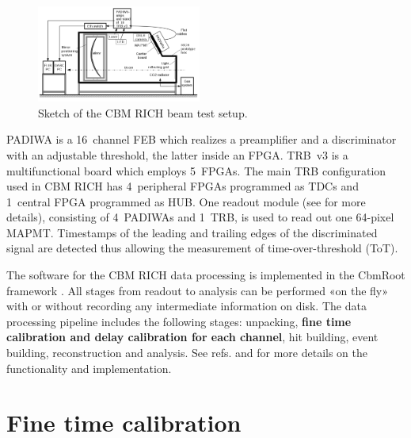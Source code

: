 \documentclass[final,5p,times,twocolumn]{elsarticle}
\begin{document}
\begin{figure}[h]
	\centering
	\includegraphics[width=0.48\textwidth]{figures/Beamtime_eng_RICH2016_poster.png}
	\caption{Sketch of the CBM RICH beam test setup.}
	\label{fig:BeamSetup}
\end{figure}

PADIWA is a 16~channel FEB which realizes a preamplifier and a discriminator with an adjustable threshold, the latter inside an FPGA. TRB~v3 is a multifunctional board which employs 5~FPGAs. The main TRB configuration used in CBM RICH has 4~peripheral FPGAs programmed as TDCs \cite{TDC} and 1~central FPGA programmed as HUB. One readout module (see \cite{PEPAN} for more details), consisting of 4~PADIWAs and 1~TRB, is used to read out one 64-pixel MAPMT. Timestamps of the leading and trailing edges of the discriminated signal are detected thus allowing the measurement of time-over-threshold (ToT).

The software for the CBM RICH data processing is implemented in the CbmRoot framework \cite{SEMEN}. All stages from readout to analysis can be performed «on the fly» with or without recording any intermediate information on disk. The data processing pipeline includes the following stages: unpacking, \textbf{fine time calibration and delay calibration for each channel}, hit building, event building, reconstruction and analysis. See refs. \cite{PEPAN} and \cite{RINGS} for more details on the functionality and implementation.


\section{Fine time calibration}
\end{document}
